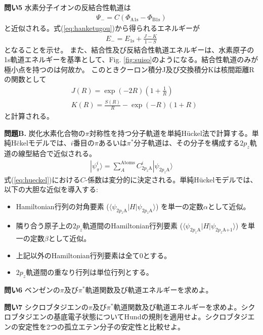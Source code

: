 \documentclass[11pt,pra,aps]{revtex4}
\begin{document}

\noindent
{\bf 問い5}
水素分子イオンの反結合性軌道は
\begin{align}
  \Psi_{-}=C(\Phi_\text{A1s}-\Phi_\text{B1s})\label{eq:hanketugou}
\end{align}
と近似される。式(\ref{eq:hanketugou})から得られるエネルギーが
\begin{align}
  E_-=E_\text{1s}+\frac{J-K}{1-S}  
\end{align}
となることを示せ。
また、結合性及び反結合性軌道エネルギーは、水素原子の1s軌道エネルギーを基準として、Fig. \ref{fig:suiso}のようになる。結合性軌道のみが極小点を持つのは何故か。
このときクーロン積分J及び交換積分Kは核間距離Rの関数として
\begin{align}
  &J(R)=\exp(-2R)\left(1+\frac{1}{R}\right) \label{eq:J} \\
  &K(R)=\frac{S(R)}{R}-\exp(-R)\left(1+R\right) \label{eq:K}
\end{align}
と計算される。

\noindent
    {\bf 問題B.} 炭化水素化合物の$\pi$対称性を持つ分子軌道を単純H\"uckel法で計算する。単純H\"ckelモデルでは、$i$番目の$\pi$あるいは$\pi^*$分子軌道は、その分子を構成する$2p_z$軌道の線型結合で近似される。
\begin{align}
  |\psi_\pi^i\rangle=\sum_A^\text{Atoms}C^i_{2p_z\text{A}}|\psi_{2p_z\text{A}}\rangle \label{eq:hueckel}
\end{align}
式(\ref{eq:hueckel})における$C$-係数は変分的に決定される。単純H\"uckelモデルでは、以下の大胆な近似を導入する:
\begin{itemize}
\item Hamiltonian行列の対角要素 ($\langle\psi_{2p_z\text{A}}|H|\psi_{2p_z\text{A}}\rangle$) を単一の定数$\alpha$として近似。
\item 隣り合う原子上の$2p_z$軌道間のHamiltonian行列要素 ($\langle\psi_{2p_z\text{A}}|H|\psi_{2p_z\text{A+1}}\rangle$) を単一の定数$\beta$として近似。
\item 上記以外のHamiltonian行列要素は全て0とする。
\item $2p_z$軌道間の重なり行列は単位行列とする。
\end{itemize}

\noindent
{\bf 問い6} ベンゼンの$\pi$及び$\pi^*$軌道関数及び軌道エネルギーを求めよ。

\noindent
{\bf 問い7} シクロブタジエンの$\pi$及び$\pi^*$軌道関数及び軌道エネルギーを求めよ。シクロブタジエンの基底電子状態についてHundの規則を適用せよ。シクロブタジエンの安定性を2つの孤立エテン分子の安定性と比較せよ。
\end{document}
